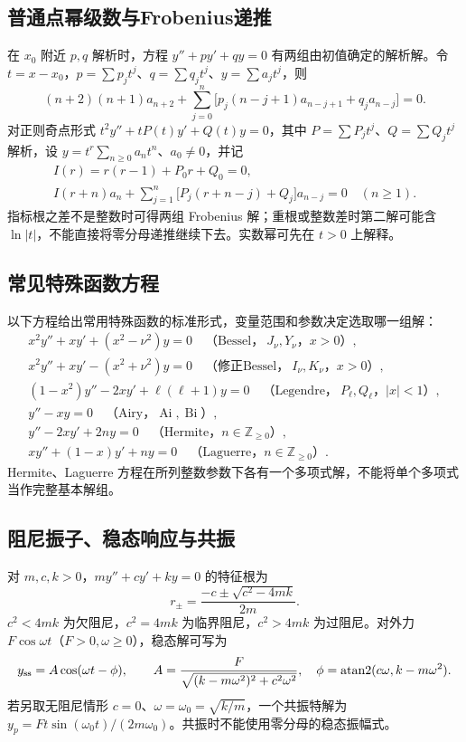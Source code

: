 \documentclass[../main.tex]{subfiles}
\begin{document}
\subsection{普通点幂级数与Frobenius递推}
在 $x_0$ 附近 $p,q$ 解析时，方程 $y''+py'+qy=0$ 有两组由初值确定的解析解。令 $t=x-x_0$，$p=\sum p_jt^j$、$q=\sum q_jt^j$、$y=\sum a_jt^j$，则
\[
(n+2)(n+1)a_{n+2}
+\sum_{j=0}^n\bigl[p_j(n-j+1)a_{n-j+1}+q_ja_{n-j}\bigr]=0.
\]
对正则奇点形式 $t^2y''+tP(t)y'+Q(t)y=0$，其中 $P=\sum P_jt^j$、$Q=\sum Q_jt^j$ 解析，设 $y=t^r\sum_{n\ge0}a_nt^n$、$a_0\ne0$，并记
\begin{gather*}
I(r)=r(r-1)+P_0r+Q_0=0,\\
I(r+n)a_n+\sum_{j=1}^n\bigl[P_j(r+n-j)+Q_j\bigr]a_{n-j}=0\quad(n\ge1).
\end{gather*}
指标根之差不是整数时可得两组 Frobenius 解；重根或整数差时第二解可能含 $\ln|t|$，不能直接将零分母递推继续下去。实数幂可先在 $t>0$ 上解释。

\subsection{常见特殊函数方程}
以下方程给出常用特殊函数的标准形式，变量范围和参数决定选取哪一组解：
\begin{gather*}
x^2y''+xy'+(x^2-\nu^2)y=0
\quad\text{（Bessel，}\ J_\nu,Y_\nu\text{，}x>0\text{）},\\
x^2y''+xy'-(x^2+\nu^2)y=0
\quad\text{（修正Bessel，}\ I_\nu,K_\nu\text{，}x>0\text{）},\\
(1-x^2)y''-2xy'+\ell(\ell+1)y=0
\quad\text{（Legendre，}\ P_\ell,Q_\ell\text{，}|x|<1\text{）},\\
y''-xy=0\quad\text{（Airy，}\operatorname{Ai},\operatorname{Bi}\text{）},\\
y''-2xy'+2ny=0\quad\text{（Hermite，}n\in\mathbb Z_{\ge0}\text{）},\\
xy''+(1-x)y'+ny=0\quad\text{（Laguerre，}n\in\mathbb Z_{\ge0}\text{）}.
\end{gather*}
Hermite、Laguerre 方程在所列整数参数下各有一个多项式解，不能将单个多项式当作完整基本解组。

\subsection{阻尼振子、稳态响应与共振}
对 $m,c,k>0$，$my''+cy'+ky=0$ 的特征根为
\[
r_{\pm}=\frac{-c\pm\sqrt{c^2-4mk}}{2m}.
\]
$c^2<4mk$ 为欠阻尼，$c^2=4mk$ 为临界阻尼，$c^2>4mk$ 为过阻尼。对外力 $F\cos\omega t$（$F>0,\omega\ge0$），稳态解可写为
\[
y_{\rm ss}=A\cos(\omega t-\phi),\qquad
A=\frac F{\sqrt{(k-m\omega^2)^2+c^2\omega^2}},\quad
\phi=\operatorname{atan2}(c\omega,k-m\omega^2).
\]
若另取无阻尼情形 $c=0$、$\omega=\omega_0=\sqrt{k/m}$，一个共振特解为 $y_p=F t\sin(\omega_0t)/(2m\omega_0)$。共振时不能使用零分母的稳态振幅式。
\end{document}

